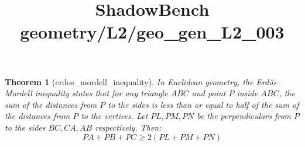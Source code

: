 \documentclass{article}
\title{ShadowBench geometry/L2/geo\_gen\_L2\_003}
\newtheorem{theorem}{Theorem}
\begin{document}
\maketitle

\begin{theorem}[erdos_mordell_inequality]\label{thm:erdos_mordell}
In Euclidean geometry, the Erdős–Mordell inequality states that for any triangle $ABC$ and point $P$ inside $ABC$, the sum of the distances from $P$ to the sides is less than or equal to half of the sum of the distances from $P$ to the vertices.
Let $PL, PM, PN$ be the perpendiculars from $P$ to the sides $BC, CA, AB$ respectively. Then:
\[
PA + PB + PC \ge 2(PL + PM + PN)
\]
\end{theorem}
\end{document}
